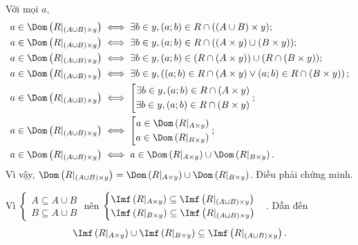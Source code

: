 Với mọi $a$, \begin{align*}
   a \in \Dom\left(R|_{(A \cup B) \times y}\right) &\iff \exists b \in y, (a; b) \in R \cap ((A \cup B) \times y); \\
   a \in \Dom\left(R|_{(A \cup B) \times y}\right) &\iff \exists b \in y, (a; b) \in R \cap ((A \times y) \cup (B \times y)); \\
   a \in \Dom\left(R|_{(A \cup B) \times y}\right) &\iff \exists b \in y, (a; b) \in (R \cap (A \times y)) \cup (R \cap (B \times y)); \\
   a \in \Dom\left(R|_{(A \cup B) \times y}\right) &\iff \exists b \in y, \left((a; b) \in R \cap (A \times y) \lor (a; b) \in R \cap (B \times y)\right); \\
   a \in \Dom\left(R|_{(A \cup B) \times y}\right) &\iff \left[\begin{aligned}
      \exists b \in y, (a; b) \in R \cap (A \times y) \\
      \exists b \in y, (a; b) \in R \cap (B \times y)
   \end{aligned}\right. ; \\
   a \in \Dom\left(R|_{(A \cup B) \times y}\right) &\iff  \left[\begin{aligned}
      a \in \Dom\left(R|_{A \times y}\right) \\
      a \in \Dom\left(R|_{B \times y}\right)
   \end{aligned}\right.; \\
   a \in \Dom\left(R|_{(A \cup B) \times y}\right) &\iff a \in \Dom\left(R|_{A \times y}\right) \cup \Dom\left(R|_{B \times y}\right).
\end{align*}
Vì vậy, $\Dom\left(R|_{(A \cup B) \times y}\right) = \Dom\left(R|_{A \times y}\right) \cup \Dom\left(R|_{B \times y}\right)$. Điều phải chứng minh.

\stepSubexercise Vì $\begin{cases}
   A \subseteq A \cup B \\
   B \subseteq A \cup B
\end{cases}$ nên $\begin{cases}
   \Imf\left(R|_{A \times y}\right) \subseteq \Imf\left(R|_{(A \cup B) \times y}\right) \\
   \Imf\left(R|_{B \times y}\right) \subseteq \Imf\left(R|_{(A \cup B) \times y}\right)
\end{cases}$. Dẫn đến \begin{equation*}
   \Imf\left(R|_{A \times y}\right) \cup \Imf\left(R|_{B \times y}\right) \subseteq \Imf\left(R|_{(A \cup B) \times y}\right).
\end{equation*}

